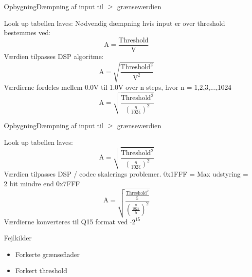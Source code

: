 \begin{frame}{Opbygning}{Dæmpning af input til $\geq$ grænseværdien}
	\begin{block}{Look up tabellen laves:}
	Nødvendig dæmpning hvis input er over threshold bestemmes ved:
	$$ \text{A} = \frac{\text{Threshold}}{\text{V}}$$
	Værdien tilpasses DSP algoritme:
	\alert{$$ \text{A} = \sqrt{\frac{\text{Threshold}^2}{\text{V}^2}}$$}
	Værdierne fordeles mellem 0.0V til 1.0V over n steps, hvor n = 1,2,3,...,1024
	$$ \text{A} = \sqrt{\frac{\text{Threshold}^2}{(\frac{n}{1024})^2}}$$
	\end{block}	
\end{frame}

\begin{frame}{Opbygning}{Dæmpning af input til $\geq$ grænseværdien}
	\begin{block}{Look up tabellen laves:}
	$$ \text{A} = \sqrt{\frac{\text{Threshold}^2}{(\frac{n}{1024})^2}}$$
		Værdien tilpasses DSP / codec skalerings problemer. 0x1FFF = Max udstyring = 2 bit mindre end 0x7FFF
	\alert{$$ \text{A} = \sqrt{\frac{\frac{\text{Threshold}^2}{5}}{(\frac{\frac{n}{1024}}{5})^2}}$$}
		Værdierne konverteres til Q15 format ved $\cdot 2^{15}$
	\end{block}	
\begin{block}{\alert{Fejlkilder}}
	\begin{itemize}
		\item Forkerte grænseflader
		\item Forkert threshold
	\end{itemize}	
\end{block}
\end{frame}




